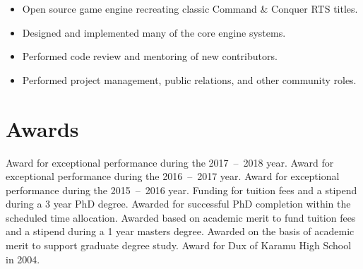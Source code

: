 \documentclass[print]{cv-style}
\begin{document}
\begin{entrylist}
{\begin{itemize}
    \end{itemize}}
  {
\begin{itemize}
    \item Open source game engine recreating classic Command \& Conquer RTS titles.
    \item Designed and implemented many of the core engine systems.
    \item Performed code review and mentoring of new contributors.
	\item Performed project management, public relations, and other community roles.
  \end{itemize}}

\end{entrylist}


\section{Awards}
\begin{entrylist}
{Award for exceptional performance during the 2017~--~2018 year.}
{Award for exceptional performance during the 2016~--~2017 year.}
{Award for exceptional performance during the 2015~--~2016 year.}
{Funding for tuition fees and a stipend during a 3 year PhD degree.}
{Awarded for successful PhD completion within the scheduled time allocation.}
{Awarded based on academic merit to fund tuition fees and a stipend during a 1 year masters degree.}
{Awarded on the basis of academic merit to support graduate degree study.}
\vspace{-3mm}
\vspace{-3mm}
{Award for Dux of Karamu High School in 2004.}
\end{entrylist}
\end{document}

